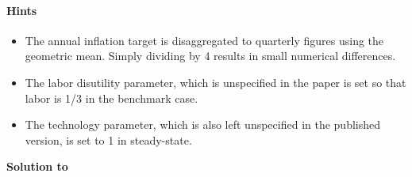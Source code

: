 \paragraph{Hints}

\begin{itemize}

\item The annual inflation target is disaggregated to quarterly figures using the geometric mean.
Simply dividing by 4 results in small numerical differences.

\item The labor disutility parameter, which is unspecified in the paper is set so that labor is 1/3 in the benchmark case.

\item The technology parameter, which is also left unspecified in the published version, is set to 1 in steady-state.
  
\end{itemize}


\begin{solution}\textbf{Solution to }
\ifDisplaySolutions

\fi
\newpage
\end{solution}